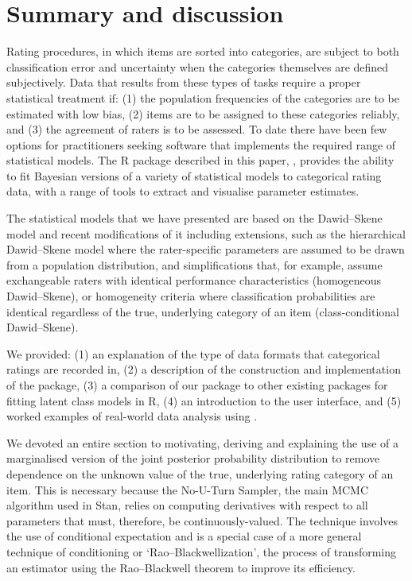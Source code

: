\hypertarget{sec:summary}{%
\section{Summary and discussion}\label{sec:summary}}

Rating procedures, in which items are sorted into categories, are subject to both
classification error and uncertainty when the categories themselves are defined
subjectively. Data that results from these types of tasks require a proper
statistical treatment if: (1) the population frequencies of the categories are
to be estimated with low bias, (2) items are to be assigned to these
categories reliably, and (3) the agreement of raters is to be assessed.
To date there have been few options for practitioners seeking software that
implements the required range of statistical models. The R package described in
this paper, , provides the ability to fit
Bayesian versions of a variety of statistical models to categorical rating
data, with a range of tools to extract and visualise parameter estimates.

The statistical models that we have presented are based on the Dawid--Skene
model and recent modifications of it including extensions, such as the
hierarchical Dawid--Skene model where the rater-specific parameters are assumed
to be drawn from a population distribution, and simplifications that, for
example, assume exchangeable raters with identical performance characteristics
(homogeneous Dawid--Skene), or homogeneity criteria where classification
probabilities are identical regardless of the true, underlying category of an
item (class-conditional Dawid--Skene).

We provided: (1) an explanation of the type of data formats that categorical
ratings are recorded in, (2) a description of the construction and implementation of the
package, (3) a comparison of our package to other existing packages for fitting
latent class models in R, (4) an introduction to the user interface,
and (5) worked examples of real-world data analysis using .

We devoted an entire section to motivating, deriving and explaining the use of
a marginalised version of the joint posterior probability distribution to
remove dependence on the unknown value of the true, underlying rating category
of an item. This is necessary because the No-U-Turn Sampler, the main MCMC algorithm
used in Stan, relies on computing derivatives with respect to all parameters that
must, therefore, be continuously-valued. The technique involves the use of
conditional expectation and is a special case of a more general technique of
conditioning or `Rao--Blackwellization', the process of transforming an
estimator using the Rao--Blackwell theorem to improve its efficiency.

